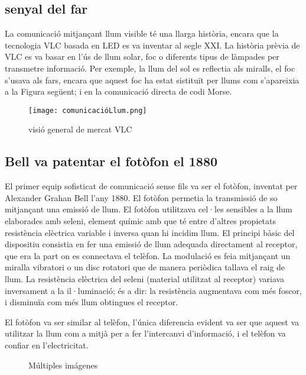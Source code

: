 \subsection*{senyal del far}


La comunicació mitjançant llum visible té una llarga història, encara que la tecnologia VLC basada en LED es va inventar al segle XXI. La història prèvia de VLC es va basar en l'ús de llum solar, foc o diferents tipus de làmpades per transmetre informació. Per exemple, la llum del sol es reflectia als miralls, el foc s'usava als fars, encara que aquest foc ha estat sistituït per llums com s'apareixia a la Figura següent; i en la comunicació directa de codi Morse.


\begin{figure}[h!]
    \centering
    \texttt{[image: comunicacióLlum.png]}
    \caption{visió general de mercat VLC}
    \label{fig:method}
\end{figure}

\subsection*{Bell va patentar el fotòfon el 1880}


El primer equip sofisticat de comunicació sense fils va ser el fotòfon, inventat per Alexander Grahan Bell l'any 1880.
El fotòfon permetia la transmissió de so mitjançant una emissió de llum. El fotòfon utilitzava cel·les sensibles a la llum elaborades amb seleni, element químic amb que té entre d'altres propietats resistència elèctrica variable i inversa quan hi incidim llum. El principi bàsic del dispositiu consistia en fer una emissió de llum adequada directament al receptor, que era la part on es connectava el telèfon. La modulació es feia mitjançant un miralla vibratori o un disc rotatori que de manera periòdica tallava el raig de llum. La resistència elèctrica del seleni (material utilitzat al receptor) variava inversament a la il·luminació; és a dir: la resistència augmentava com més foscor, i disminuïa com més llum obtingues el receptor.

El fotòfon va ser similar al telèfon, l'única diferencia evident va ser que aquest va utilitzar la llum com a mitjà per a fer l'intercanvi d'informació, i el telèfon va confiar en l'electricitat.


\begin{figure}
    \centering
    \caption{Múltiples imágenes}
    \label{Fotofòn}
\end{figure}


